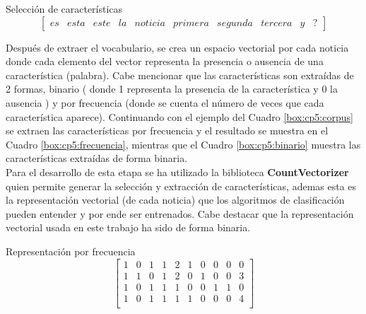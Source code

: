 \begin{mygraybox}[label={box:cp5:caracteristicas}]{Selección de características} 
\begin{equation*}
\begin{bmatrix}
es & esta & este & la & noticia & primera & segunda & tercera & y & ?
\end{bmatrix}
\end{equation*}
\end{mygraybox}




Después de extraer el  vocabulario, se crea un espacio vectorial por cada noticia donde cada elemento del vector representa la presencia o ausencia de una característica (palabra). Cabe mencionar que las características son extraídas de 2 formas, binario ( donde 1 representa la presencia de la característica y 0 la ausencia ) y por frecuencia (donde se cuenta el número de veces que cada característica aparece). Continuando con el ejemplo del Cuadro \ref{box:cp5:corpus} se extraen las características por frecuencia y el resultado se muestra en el Cuadro \ref{box:cp5:frecuencia}, mientras que el Cuadro \ref{box:cp5:binario} muestra las características extraídas de forma binaria.\\

Para el desarrollo de esta etapa se ha utilizado la biblioteca \textbf{CountVectorizer} quien permite generar la selección y extracción de características, ademas esta es la representación vectorial (de cada noticia) que los algoritmos de clasificación pueden entender y por ende ser entrenados. Cabe destacar que la representación vectorial usada en este trabajo ha sido de forma binaria.\\

\begin{mygraybox}[label={box:cp5:frecuencia}]{Representación por frecuencia} 
\begin{equation*}
\begin{bmatrix}
1 & 0 & 1 & 1 & 2 & 1 & 0 & 0 & 0 & 0\\
1 & 1 & 0 & 1 & 2 & 0 & 1 & 0 & 0 & 3\\
1 & 0 & 1 & 1 & 1 & 0 & 0 & 1 & 1 & 0\\
1 & 0 & 1 & 1 & 1 & 1 & 0 & 0 & 0 & 4\\
\end{bmatrix}
\end{equation*}
\end{mygraybox}

